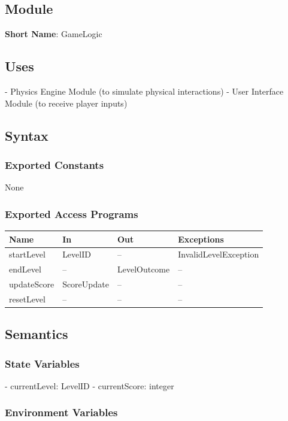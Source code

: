 \documentclass[12pt]{article}
\begin{document}
\subsection{Module}

\textbf{Short Name}: GameLogic

\subsection{Uses}

- Physics Engine Module (to simulate physical interactions)
- User Interface Module (to receive player inputs)

\subsection{Syntax}

\subsubsection{Exported Constants}

None

\subsubsection{Exported Access Programs}

\begin{tabular}{|l|l|l|l|}
\hline
\textbf{Name} & \textbf{In} & \textbf{Out} & \textbf{Exceptions} \\
\hline
startLevel & LevelID & -- & InvalidLevelException \\
\hline
endLevel & -- & LevelOutcome & -- \\
\hline
updateScore & ScoreUpdate & -- & -- \\
\hline
resetLevel & -- & -- & -- \\
\hline
\end{tabular}

\subsection{Semantics}

\subsubsection{State Variables}

- currentLevel: LevelID
- currentScore: integer

\subsubsection{Environment Variables}
\end{document}
